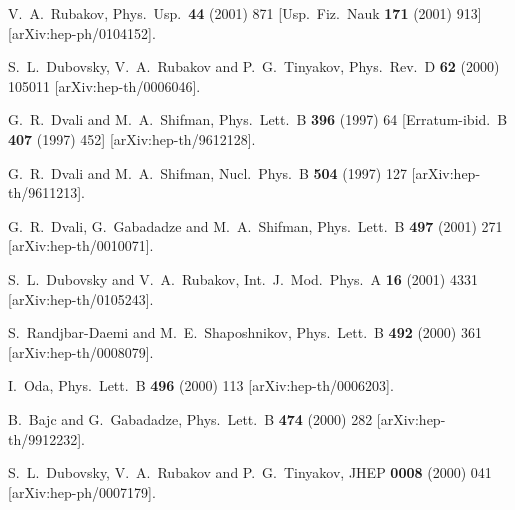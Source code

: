 \documentclass[a4paper,12pt]{article}
\begin{document}
\begin{thebibliography}{99}
V.~A.~Rubakov,
Phys.\ Usp.\  {\bf 44} (2001) 871
[Usp.\ Fiz.\ Nauk {\bf 171} (2001) 913]
[arXiv:hep-ph/0104152].

S.~L.~Dubovsky, V.~A.~Rubakov and P.~G.~Tinyakov,
Phys.\ Rev.\ D {\bf 62} (2000) 105011
[arXiv:hep-th/0006046].

G.~R.~Dvali and M.~A.~Shifman,
Phys.\ Lett.\ B {\bf 396} (1997) 64
[Erratum-ibid.\ B {\bf 407} (1997) 452]
[arXiv:hep-th/9612128].

G.~R.~Dvali and M.~A.~Shifman,
Nucl.\ Phys.\ B {\bf 504} (1997) 127
[arXiv:hep-th/9611213].

G.~R.~Dvali, G.~Gabadadze and M.~A.~Shifman,
Phys.\ Lett.\ B {\bf 497} (2001) 271
[arXiv:hep-th/0010071].

S.~L.~Dubovsky and V.~A.~Rubakov,
Int.\ J.\ Mod.\ Phys.\ A {\bf 16} (2001) 4331
[arXiv:hep-th/0105243].

S.~Randjbar-Daemi and M.~E.~Shaposhnikov,
Phys.\ Lett.\ B {\bf 492} (2000) 361
[arXiv:hep-th/0008079].

I.~Oda,
Phys.\ Lett.\ B {\bf 496} (2000) 113
[arXiv:hep-th/0006203].

B.~Bajc and G.~Gabadadze,
Phys.\ Lett.\ B {\bf 474} (2000) 282
[arXiv:hep-th/9912232].

S.~L.~Dubovsky, V.~A.~Rubakov and P.~G.~Tinyakov,
JHEP {\bf 0008} (2000) 041
[arXiv:hep-ph/0007179].


\end{thebibliography}
\end{document}
